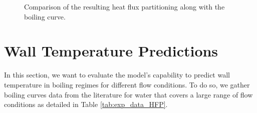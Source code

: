 \begin{figure}[!h]
\caption{Comparison of the resulting heat flux partitioning along with the boiling curve.}
\label{fig:fullkoss_hfp}
\end{figure}




\section{Wall Temperature Predictions}


In this section, we want to evaluate the model's capability to predict wall temperature in boiling regimes for different flow conditions. To do so, we gather boiling curves data from the literature for water that covers a large range of flow conditions as detailed in Table \ref{tab:exp_data_HFP}.


